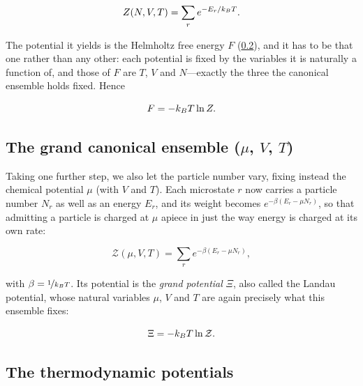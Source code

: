         \begin{equation}\label{eq:canonical-partition}
            Z(N,V,T) = \sum_{r}e^{-E_r/\kB T} .
        \end{equation}

        The potential it yields is the Helmholtz free energy $F$ (\cref{sec:thermo-potentials}), and it has to be that one rather than any other: each potential is fixed by the variables it is naturally a function of, and those of $F$ are $T$, $V$ and $N$---exactly the three the canonical ensemble holds fixed. Hence

        \begin{equation}\label{eq:helmholtz}
            F = -\kB T\ln Z .
        \end{equation}

    \subsection{The grand canonical ensemble ($\mu$, $V$, $T$)}

        Taking one further step, we also let the particle number vary, fixing instead the chemical potential $\mu$ (with $V$ and $T$). Each microstate $r$ now carries a particle number $N_r$ as well as an energy $E_r$, and its weight becomes $e^{-\beta\left(E_r-\mu N_r\right)}$, so that admitting a particle is charged at $\mu$ apiece in just the way energy is charged at its own rate:

        \begin{equation}\label{eq:grand-partition}
            \mathcal{Z}(\mu,V,T) = \sum_{r}e^{-\beta\left(E_r - \mu N_r\right)} ,
        \end{equation}

        with $\beta = \nicefrac{1}{k_{B} T}$. Its potential is the \emph{grand potential} $\Xi$, also called the Landau potential, whose natural variables $\mu$, $V$ and $T$ are again precisely what this ensemble fixes:

        \begin{equation}\label{eq:grand-potential}
            \Xi = -\kB T\ln \mathcal{Z} .
        \end{equation}

    \subsection{The thermodynamic potentials}\label{sec:thermo-potentials}

